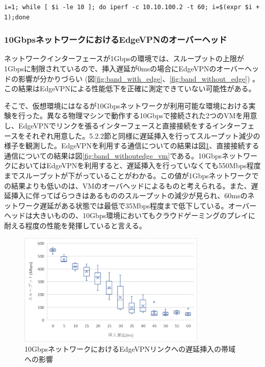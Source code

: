 \begin{lstlisting}[caption=帯域計測,label=measure_band]
    i=1; while [ $i -le 10 ]; do iperf -c 10.10.100.2 -t 60; i=$(expr $i + 1);done
\end{lstlisting}

\subsubsection{10GbpsネットワークにおけるEdgeVPNのオーバーヘッド}
ネットワークインターフェースが1Gbpsの環境では、スループットの上限が1Gbpsに制限されているので、挿入遅延が0msの場合にEdgeVPNのオーバーヘッドの影響が分かりづらい (図\ref{fig:band_with_edge}、\ref{fig:band_without_edge}) 。この結果はEdgeVPNによる性能低下を正確に測定できていない可能性がある。

そこで、仮想環境にはなるが10Gbpsネットワークが利用可能な環境における実験を行った。異なる物理マシンで動作する10Gbpsで接続された2つのVMを用意し、EdgeVPNでリンクを張るインターフェースと直接接続をするインターフェースをそれぞれ用意した。5.2.2節と同様に遅延挿入を行ってスループット減少の様子を観測した。EdgeVPNを利用する通信についての結果は図\ref{fig:band_withedge_vm}、直接接続する通信についての結果は図\ref{fig:band_withoutedge_vm}である。10GbpsネットワークにおいてはEdgeVPNを利用すると、遅延挿入を行っていなくても550Mbps程度までスループットが下がっていることがわかる。この値が1Gbpsネットワークでの結果よりも低いのは、VMのオーバヘッドによるものと考えられる。また、遅延挿入に伴ってばらつきはあるもののスループットの減少が見られ、60msのネットワーク遅延がある状態では最低で35Mbps程度まで低下している。オーバーヘッドは大きいものの、10Gbps環境においてもクラウドゲーミングのプレイに耐える程度の性能を発揮していると言える。


\begin{figure}[h!]
    \centering
    \includegraphics[width=0.8\textwidth,keepaspectratio,clip]{img/band_withedge_vm.eps}
    \caption{10GbpsネットワークにおけるEdgeVPNリンクへの遅延挿入の帯域への影響}
    \label{fig:band_withedge_vm}
\end{figure}

